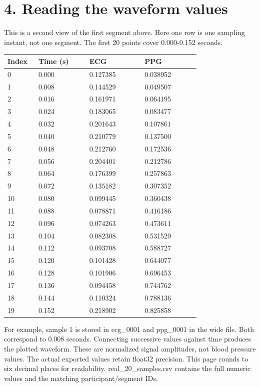 \documentclass[11pt,letterpaper]{article}
\begin{document}
\section*{4. Reading the waveform values}
This is a second view of the first segment above. Here one row is one sampling instant, not one segment. The first 20 points cover 0.000-0.152 seconds.

\par\smallskip
\begin{tabular}{@{}p{0.14\linewidth}p{0.23\linewidth}p{0.25\linewidth}p{0.25\linewidth}@{}}\toprule
Index & Time (s) & ECG & PPG\\\midrule
0 & 0.000 & 0.127385 & 0.038952\\
1 & 0.008 & 0.144529 & 0.049507\\
2 & 0.016 & 0.161971 & 0.064195\\
3 & 0.024 & 0.183065 & 0.083477\\
4 & 0.032 & 0.201643 & 0.107861\\
5 & 0.040 & 0.210779 & 0.137500\\
6 & 0.048 & 0.212760 & 0.172536\\
7 & 0.056 & 0.204401 & 0.212786\\
8 & 0.064 & 0.176399 & 0.257863\\
9 & 0.072 & 0.135182 & 0.307352\\
10 & 0.080 & 0.099445 & 0.360438\\
11 & 0.088 & 0.078871 & 0.416186\\
12 & 0.096 & 0.074263 & 0.473611\\
13 & 0.104 & 0.082308 & 0.531529\\
14 & 0.112 & 0.093708 & 0.588727\\
15 & 0.120 & 0.101428 & 0.644077\\
16 & 0.128 & 0.101906 & 0.696453\\
17 & 0.136 & 0.094458 & 0.744762\\
18 & 0.144 & 0.110324 & 0.788136\\
19 & 0.152 & 0.218902 & 0.825858\\
\bottomrule\end{tabular}\par\smallskip

For example, sample 1 is stored in ecg\_0001 and ppg\_0001 in the wide file. Both correspond to 0.008 seconds. Connecting successive values against time produces the plotted waveform. These are normalized signal amplitudes, not blood pressure values.
The actual exported values retain float32 precision. This page rounds to six decimal places for readability. real\_20\_samples.csv contains the full numeric values and the matching participant/segment IDs.\newpage
\end{document}
